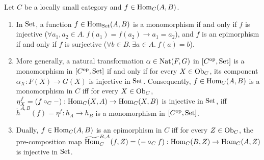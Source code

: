 \documentclass[10pt,a4paper]{article}
\begin{document}
\begin{theorem}\label{thm:mono_epi_yoneda}
Let $C$ be a locally small category and $f \in {\textrm{Hom}}_C(A, B)$.
\begin{enumerate}
\item In ${\textrm{Set}}$, a function $f \in {\textrm{Hom}}_{\textrm{Set}}(A, B)$ is a monomorphism if and only if $f$ is injective ($\forall a_1, a_2 \in A.\ f(a_1) = f(a_2) \to a_1 = a_2$), and $f$ is an epimorphism if and only if $f$ is surjective ($\forall b \in B.\ \exists a \in A.\ f(a) = b$).
\item More generally, a natural transformation $\alpha \in {\textrm{Nat}}(F, G)$ in $[C^{\textrm{op}}, {\textrm{Set}}]$ is a monomorphism in $[C^{\textrm{op}}, {\textrm{Set}}]$ if and only if for every $X \in {\textrm{Ob}}_C$, its component $\alpha_X : F(X) \to G(X)$ is injective in ${\textrm{Set}}$. Consequently, $f \in {\textrm{Hom}}_C(A, B)$ is a monomorphism in $C$ iff for every $X \in {\textrm{Ob}}_C$, $\eta^f_X = (f \circ_C -) : {\textrm{Hom}}_C(X, A) \to {\textrm{Hom}}_C(X, B)$ is injective in ${\textrm{Set}}$, iff $\widetilde{h}^{A,B}(f) = \eta^f : h_A \to h_B$ is a monomorphism in $[C^{\textrm{op}}, {\textrm{Set}}]$.
\item Dually, $f \in {\textrm{Hom}}_C(A, B)$ is an epimorphism in $C$ iff for every $Z \in {\textrm{Ob}}_C$, the pre-composition map ${\widetilde{{\textrm{Hom}}}\textrm{}}_C^{B,A}(f, Z) = (- \circ_C f) : {\textrm{Hom}}_C(B, Z) \to {\textrm{Hom}}_C(A, Z)$ is injective in ${\textrm{Set}}$.
\end{enumerate}
\end{theorem}
\myprf
\end{document}
